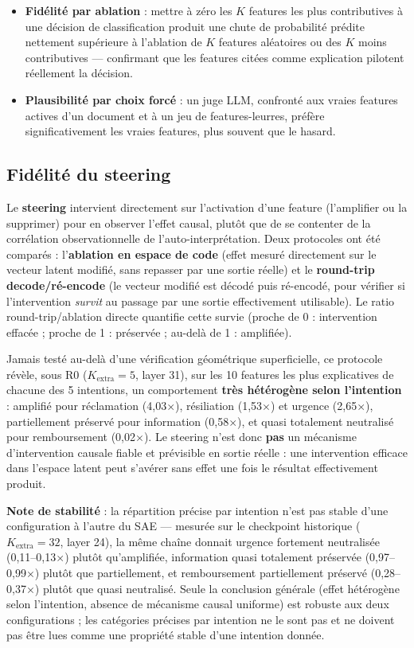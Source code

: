 \documentclass[11pt]{article}
\begin{document}
\begin{itemize}
  \item \textbf{Fidélité par ablation} : mettre à zéro les $K$ features les
    plus contributives à une décision de classification produit une chute de
    probabilité prédite nettement supérieure à l'ablation de $K$ features
    aléatoires ou des $K$ moins contributives --- confirmant que les features
    citées comme explication pilotent réellement la décision.
  \item \textbf{Plausibilité par choix forcé} : un juge LLM, confronté aux
    vraies features actives d'un document et à un jeu de features-leurres,
    préfère significativement les vraies features, plus souvent que le
    hasard.
\end{itemize}

\subsection{Fidélité du steering}

Le \textbf{steering} intervient directement sur l'activation d'une feature
(l'amplifier ou la supprimer) pour en observer l'effet causal, plutôt que de
se contenter de la corrélation observationnelle de l'auto-interprétation.
Deux protocoles ont été comparés : l'\textbf{ablation en espace de code}
(effet mesuré directement sur le vecteur latent modifié, sans repasser par
une sortie réelle) et le \textbf{round-trip decode/ré-encode} (le vecteur
modifié est décodé puis ré-encodé, pour vérifier si l'intervention
\emph{survit} au passage par une sortie effectivement utilisable). Le ratio
round-trip/ablation directe quantifie cette survie (proche de 0 : intervention
effacée ; proche de 1 : préservée ; au-delà de 1 : amplifiée).

Jamais testé au-delà d'une vérification géométrique superficielle, ce
protocole révèle, sous R0 ($K_\text{extra}=5$, layer 31), sur les 10
features les plus explicatives de chacune des 5 intentions, un comportement
\textbf{très hétérogène selon l'intention} : amplifié pour réclamation
(4,03$\times$), résiliation (1,53$\times$) et urgence (2,65$\times$),
partiellement préservé pour information (0,58$\times$), et quasi totalement
neutralisé pour remboursement (0,02$\times$). Le steering n'est donc
\textbf{pas} un mécanisme d'intervention causale fiable et prévisible en
sortie réelle : une intervention efficace dans l'espace latent peut s'avérer
sans effet une fois le résultat effectivement produit.

\textbf{Note de stabilité} : la répartition précise par intention n'est pas
stable d'une configuration à l'autre du SAE --- mesurée sur le checkpoint
historique ($K_\text{extra}=32$, layer 24), la même chaîne donnait urgence
fortement neutralisée (0,11--0,13$\times$) plutôt qu'amplifiée, information
quasi totalement préservée (0,97--0,99$\times$) plutôt que partiellement, et
remboursement partiellement préservé (0,28--0,37$\times$) plutôt que quasi
neutralisé. Seule la conclusion générale (effet hétérogène selon l'intention,
absence de mécanisme causal uniforme) est robuste aux deux configurations ;
les catégories précises par intention ne le sont pas et ne doivent pas être
lues comme une propriété stable d'une intention donnée.
\end{document}
